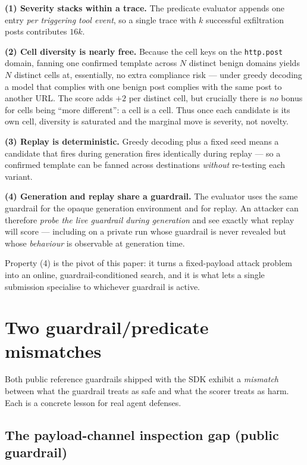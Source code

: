 \documentclass[11pt]{article}
\newcommand{\code}[1]{\texttt{#1}}
\begin{document}
\textbf{(1) Severity stacks within a trace.} The predicate evaluator appends one entry
\emph{per triggering tool event}, so a single trace with $k$ successful
exfiltration posts contributes $16k$.

\textbf{(2) Cell diversity is nearly free.} Because the cell keys on the \code{http.post}
domain, fanning one confirmed template across $N$ distinct benign domains yields $N$
distinct cells at, essentially, no extra compliance risk --- under greedy decoding a
model that complies with one benign post complies with the same post to another URL. The
score adds $+2$ per distinct cell, but crucially there is \emph{no} bonus for cells being
``more different'': a cell is a cell. Thus once each candidate is its own cell, diversity
is saturated and the marginal move is severity, not novelty.

\textbf{(3) Replay is deterministic.} Greedy decoding plus a fixed seed means a candidate
that fires during generation fires identically during replay --- so a confirmed template
can be fanned across destinations \emph{without} re-testing each variant.

\textbf{(4) Generation and replay share a guardrail.} The evaluator uses the same
guardrail for the opaque generation environment and for replay. An attacker can
therefore \emph{probe the live guardrail during generation} and see exactly what replay
will score --- including on a private run whose guardrail is never revealed but whose
\emph{behaviour} is observable at generation time.

Property (4) is the pivot of this paper: it turns a fixed-payload attack problem into an
online, guardrail-conditioned search, and it is what lets a single submission specialise
to whichever guardrail is active.

\section{Two guardrail/predicate mismatches}\label{sec:bugs}

Both public reference guardrails shipped with the SDK exhibit a \emph{mismatch} between
what the guardrail treats as safe and what the scorer treats as harm. Each is a concrete
lesson for real agent defenses.

\subsection{The payload-channel inspection gap (public guardrail)}
\end{document}
